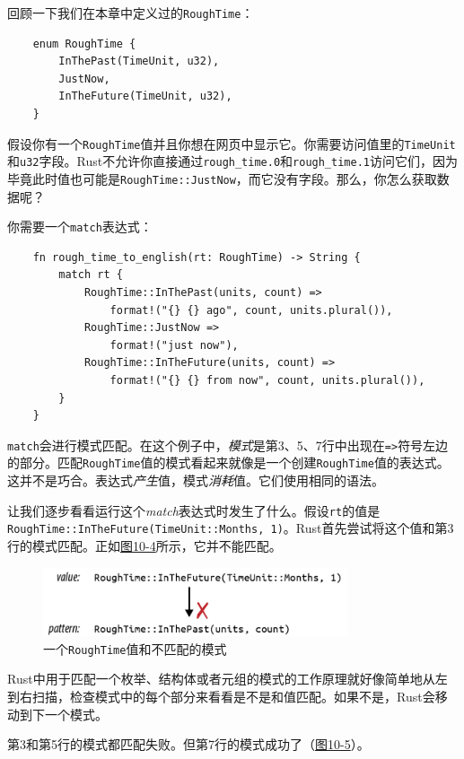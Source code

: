 回顾一下我们在本章中定义过的\texttt{RoughTime}：
\begin{verbatim}
    enum RoughTime {
        InThePast(TimeUnit, u32),
        JustNow,
        InTheFuture(TimeUnit, u32),
    }
\end{verbatim}

假设你有一个\texttt{RoughTime}值并且你想在网页中显示它。你需要访问值里的\texttt{TimeUnit}和\texttt{u32}字段。Rust不允许你直接通过\texttt{rough\_time.0}和\texttt{rough\_time.1}访问它们，因为毕竟此时值也可能是\texttt{RoughTime::JustNow}，而它没有字段。那么，你怎么获取数据呢？

你需要一个\texttt{match}表达式：
\begin{verbatim}
    fn rough_time_to_english(rt: RoughTime) -> String {
        match rt {
            RoughTime::InThePast(units, count) =>
                format!("{} {} ago", count, units.plural()),
            RoughTime::JustNow =>
                format!("just now"),
            RoughTime::InTheFuture(units, count) =>
                format!("{} {} from now", count, units.plural()),
        }
    }
\end{verbatim}
\texttt{match}会进行模式匹配。在这个例子中，\emph{模式}是第3、5、7行中出现在\texttt{=>}符号左边的部分。匹配\texttt{RoughTime}值的模式看起来就像是一个创建\texttt{RoughTime}值的表达式。这并不是巧合。表达式\emph{产生}值，模式\emph{消耗}值。它们使用相同的语法。

让我们逐步看看运行这个\emph{match}表达式时发生了什么。假设\texttt{rt}的值是\texttt{RoughTime::InTheFuture(TimeUnit::Months, 1)}。Rust首先尝试将这个值和第3行的模式匹配。正如\hyperref[f10-4]{图10-4}所示，它并不能匹配。

\begin{figure}[htbp]
    \centering
    \includegraphics[width=0.8\textwidth]{../img/f10-4.png}
    \caption{一个\texttt{RoughTime}值和不匹配的模式}
    \label{f10-4}
\end{figure}

Rust中用于匹配一个枚举、结构体或者元组的模式的工作原理就好像简单地从左到右扫描，检查模式中的每个部分来看看是不是和值匹配。如果不是，Rust会移动到下一个模式。

第3和第5行的模式都匹配失败。但第7行的模式成功了（\hyperref[f10-5]{图10-5}）。

